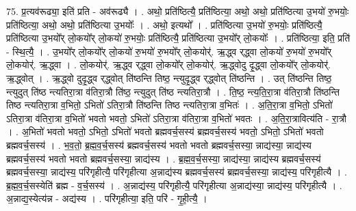 \documentclass[17pt]{extarticle}
\begin{document}
75. प्र॒त्यव॑रूढ्या॒ इति॑ प्रति - अव॑रूढ्यै । . अथो॒ प्रति॑ष्ठित्यै॒ प्रति॑ष्ठित्या॒ अथो॒ अथो॒ प्रति॑ष्ठित्या उ॒भयो॑ रु॒भयोः॒ प्रति॑ष्ठित्या॒ अथो॒ अथो॒ प्रति॑ष्ठित्या उ॒भयोः᳚ । . अथो॒ इत्यथो᳚ । . प्रति॑ष्ठित्या उ॒भयो॑ रु॒भयोः॒ प्रति॑ष्ठित्यै॒ प्रति॑ष्ठित्या उ॒भयो᳚र् लो॒कयो᳚र् लो॒कयो॑ रु॒भयोः॒ प्रति॑ष्ठित्यै॒ प्रति॑ष्ठित्या उ॒भयो᳚र् लो॒कयोः᳚ । . प्रति॑ष्ठित्या॒ इति॒ प्रति॑ - स्थि॒त्यै॒ । . उ॒भयो᳚र् लो॒कयो᳚र् लो॒कयो॑ रु॒भयो॑ रु॒भयो᳚र् लो॒कयोर्॑. ऋ॒द्ध्व र्‌द्ध्वा लो॒कयो॑ रु॒भयो॑ रु॒भयो᳚र् लो॒कयोर्॑. ऋ॒द्ध्वा । . लो॒कयोर्॑. ऋ॒द्ध्व र्‌द्ध्वा लो॒कयो᳚र् लो॒कयोर्॑. ऋ॒द्ध्वोदु दृ॒द्ध्वा लो॒कयो᳚र् लो॒कयोर्॑. ऋ॒द्ध्वोत् । . ऋ॒द्ध्वो दुदृ॒द्ध्व र्‌द्ध्वोत् ति॑ष्ठन्ति तिष्ठ॒ न्त्युदृ॒द्ध्व र्‌द्ध्वोत् ति॑ष्ठन्ति । . उत् ति॑ष्ठन्ति तिष्ठ॒ न्त्युदुत् ति॑ष्ठ न्त्यतिरा॒त्रा व॑तिरा॒त्रौ ति॑ष्ठ॒ न्त्युदुत् ति॑ष्ठ न्त्यतिरा॒त्रौ । . ति॒ष्ठ॒ न्त्य॒ति॒रा॒त्रा व॑तिरा॒त्रौ ति॑ष्ठन्ति तिष्ठ न्त्यतिरा॒त्रा व॒भितो॒ ऽभितो॑ ऽतिरा॒त्रौ ति॑ष्ठन्ति तिष्ठ न्त्यतिरा॒त्रा व॒भितः॑ । . अ॒ति॒रा॒त्रा व॒भितो॒ ऽभितो॑ ऽतिरा॒त्रा व॑तिरा॒त्रा व॒भितो॑ भवतो भवतो॒ ऽभितो॑ ऽतिरा॒त्रा व॑तिरा॒त्रा व॒भितो॑ भवतः । . अ॒ति॒रा॒त्रावित्य॑ति - रा॒त्रौ । . अ॒भितो॑ भवतो भवतो॒ ऽभितो॒ ऽभितो॑ भवतो ब्रह्मवर्च॒सस्य॑ ब्रह्मवर्च॒सस्य॑ भवतो॒ ऽभितो॒ ऽभितो॑ भवतो ब्रह्मवर्च॒सस्य॑ । . भ॒व॒तो॒ ब्र॒ह्म॒व॒र्च॒सस्य॑ ब्रह्मवर्च॒सस्य॑ भवतो भवतो ब्रह्मवर्च॒सस्या॒ न्नाद्य॑स्या॒ न्नाद्य॑स्य ब्रह्मवर्च॒सस्य॑ भवतो भवतो ब्रह्मवर्च॒सस्या॒ न्नाद्य॑स्य । . ब्र॒ह्म॒व॒र्च॒सस्या॒ न्नाद्य॑स्या॒ न्नाद्य॑स्य ब्रह्मवर्च॒सस्य॑ ब्रह्मवर्च॒सस्या॒ न्नाद्य॑स्य॒ परि॑गृहीत्यै॒ परि॑गृहीत्या अ॒न्नाद्य॑स्य ब्रह्मवर्च॒सस्य॑ ब्रह्मवर्च॒सस्या॒ न्नाद्य॑स्य॒ परि॑गृहीत्यै । . ब्र॒ह्म॒व॒र्च॒सस्येति॑ ब्रह्म - व॒र्च॒सस्य॑ । . अ॒न्नाद्य॑स्य॒ परि॑गृहीत्यै॒ परि॑गृहीत्या अ॒न्नाद्य॑स्या॒ न्नाद्य॑स्य॒ परि॑गृहीत्यै । . अ॒न्नाद्य॒स्येत्य॑न्न - अद्य॑स्य । . परि॑गृहीत्या॒ इति॒ परि॑ - गृ॒ही॒त्यै॒ । \newline
\pagebreak
{}
\end{document}
